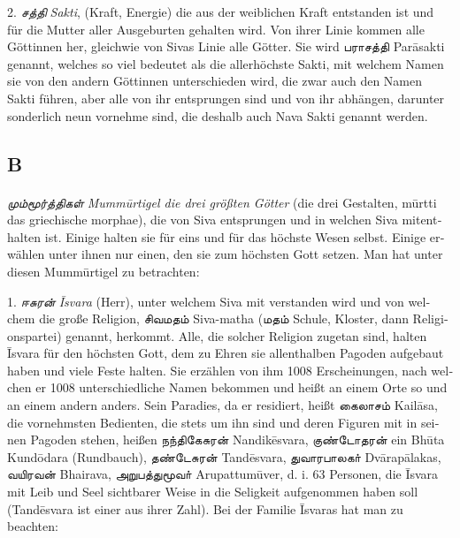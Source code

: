 \documentclass{article}
\newcommand{\TamilText}[1]{\texttamil{#1}}
\newcommand{\TamilItalic}[1]{\texttamil{\emph{#1}}}
\newcommand{\tam}[1]{\TamilText{#1}}
\newcommand{\tamitalic}[1]{\TamilItalic{#1}}
\begin{document}
{2. \tamitalic{சத்தி} \emph{\textgerman{Sakti}}, (\textgerman{Kraft, Energie}) \textgerman{die aus der weiblichen Kraft entstanden ist und für die Mutter aller Ausgeburten gehalten wird. Von ihrer Linie kommen alle Göttinnen her, gleichwie von Sivas Linie alle Götter. Sie wird} \tam{பராசத்தி} \textgerman{Par\={a}sakti genannt, welches so viel bedeutet als die allerhöchste Sakti, mit welchem Namen sie von den andern Göttinnen unterschieden wird, die zwar auch den Namen Sakti führen, aber alle von ihr entsprungen sind und von ihr abhängen, darunter sonderlich neun vornehme sind, die deshalb auch Nava Sakti genannt werden.}

\subsection*{\textgerman{B}}
\paragraph{}
\tamitalic{மும்மூர்த்திகள்} \emph{\textgerman{Mumm\={u}rtigel die drei größten Götter}} (\textgerman{die drei Gestalten, m\={u}rtti das griechische morphae), die von Siva entsprungen und in welchen Siva mitenthalten ist. Einige halten sie für eins und für das höchste Wesen selbst. Einige erwählen unter ihnen nur einen, den sie zum höchsten Gott setzen. Man hat unter diesen Mumm\={u}rtigel zu betrachten:}

\bigskip

1. \tamitalic{ஈசுரன்} \emph{\textgerman{\={I}svara}} (\textgerman{Herr}), \textgerman{unter welchem Siva mit verstanden wird und von welchem die große Religion}, \tam{சிவமதம்} \textgerman{Siva-matha} (\tam{மதம்} \textgerman{Schule, Kloster, dann Religionspartei) genannt, herkommt. Alle, die solcher Religion zugetan sind, halten \={I}svara für den höchsten Gott, dem zu Ehren sie allenthalben Pagoden aufgebaut haben und viele Feste halten. Sie erzählen von ihm 1008 Erscheinungen, nach welchen er 1008 unterschiedliche Namen bekommen und heißt an einem Orte so und an einem andern anders. Sein Paradies, da er residiert, heißt} \tam{கைலாசம்} \textgerman{Kail\={a}sa, die vornehmsten Bedienten, die stets um ihn sind und deren Figuren mit in seinen Pagoden stehen, heißen} \tam{நந்திகேசுரன்} \textgerman{Nandik\={e}svara}, \tam{குண்டோதரன்} \textgerman{ein Bh\={u}ta Kund\={o}dara (Rundbauch)}, \tam{தண்டேசுரன்} \textgerman{Tand\={e}svara}, \tam{துவாரபாலகா்} \textgerman{Dv\={a}rap\={a}lakas}, \tam{வயிரவன்} \textgerman{Bhairava}, \tam{அறுபத்துமூவா்} \textgerman{Arupattum\={u}ver, d. i. 63 Personen, die \={I}svara mit Leib und Seel sichtbarer Weise in die Seligkeit aufgenommen haben soll (Tand\={e}svara ist einer aus ihrer Zahl). Bei der Familie \={I}svaras hat man zu beachten:}

}
\end{document}
